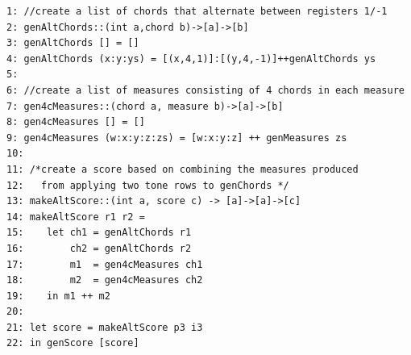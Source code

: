 \small
\begin{verbatim}
1: //create a list of chords that alternate between registers 1/-1
2: genAltChords::(int a,chord b)->[a]->[b]
3: genAltChords [] = []
4: genAltChords (x:y:ys) = [(x,4,1)]:[(y,4,-1)]++genAltChords ys
5: 
6: //create a list of measures consisting of 4 chords in each measure
7: gen4cMeasures::(chord a, measure b)->[a]->[b]
8: gen4cMeasures [] = []
9: gen4cMeasures (w:x:y:z:zs) = [w:x:y:z] ++ genMeasures zs
10:
11: /*create a score based on combining the measures produced
12:   from applying two tone rows to genChords */
13: makeAltScore::(int a, score c) -> [a]->[a]->[c]
14: makeAltScore r1 r2 = 
15:    let ch1 = genAltChords r1
16:        ch2 = genAltChords r2
17:        m1  = gen4cMeasures ch1
18:        m2  = gen4cMeasures ch2
19:    in m1 ++ m2 
20:
21: let score = makeAltScore p3 i3 
22: in genScore [score]
\end{verbatim}
\fi
